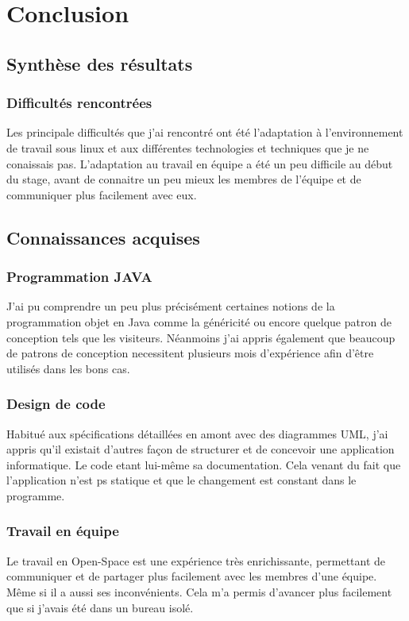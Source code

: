 \chapter{Conclusion}

\section{Synthèse des résultats}
\subsection{Difficultés rencontrées}
Les principale difficultés que j'ai rencontré ont été l'adaptation à l'environnement de travail sous linux et aux différentes technologies et techniques que je ne conaissais pas.
L'adaptation au travail en équipe a été un peu difficile au début du stage, avant de connaitre un peu mieux les membres de l'équipe et de communiquer plus facilement avec eux.
\section{Connaissances acquises}
\subsection{Programmation JAVA}
J'ai pu comprendre un peu plus précisément certaines notions de la programmation objet en Java comme la généricité ou encore quelque patron de conception tels que les visiteurs. Néanmoins j'ai appris également que beaucoup de patrons de conception necessitent plusieurs mois d'expérience afin d'être utilisés dans les bons cas.
\subsection{Design de code}
Habitué aux spécifications détaillées en amont avec des diagrammes UML, j'ai appris qu'il existait d'autres façon de structurer et de concevoir une application informatique. Le code etant lui-même sa documentation. Cela venant du fait que l'application n'est ps statique et que le changement est constant dans le programme.
\subsection{Travail en équipe}
Le travail en Open-Space est une expérience très enrichissante, permettant de communiquer et de partager plus facilement avec les membres d'une équipe. Même si il a aussi ses inconvénients. Cela m'a permis d'avancer plus facilement que si j'avais été dans un bureau isolé.
